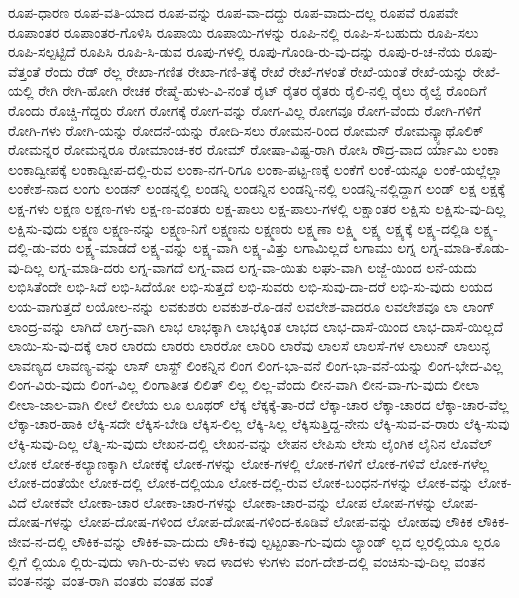 {ರೂಪ-ಧಾರಣ
ರೂಪ-ವತಿ-ಯಾದ
ರೂಪ-ವನ್ನು
ರೂಪ-ವಾ-ದದ್ದು
ರೂಪ-ವಾದು-ದಲ್ಲ
ರೂಪವೆ
ರೂಪವೇ
ರೂಪಾಂತರ
ರೂಪಾಂತರ-ಗೊಳಿಸಿ
ರೂಪಾಯಿ
ರೂಪಾಯಿ-ಗಳನ್ನು
ರೂಪಿ-ನಲ್ಲಿ
ರೂಪಿ-ಸ-ಬಹುದು
ರೂಪಿ-ಸಲು
ರೂಪಿ-ಸಲ್ಪಟ್ಟಿದೆ
ರೂಪಿಸಿ
ರೂಪಿ-ಸಿ-ಡುವ
ರೂಪು-ಗಳಲ್ಲಿ
ರೂಪು-ಗೊಂಡಿ-ರು-ವು-ದನ್ನು
ರೂಪು-ರ-ಚ-ನೆಯ
ರೂಪು-ವೆತ್ತಂತೆ
ರೆಂದು
ರೆಡ್
ರೆಲ್ಲ
ರೇಖಾ-ಗಣಿತ
ರೇಖಾ-ಗಣಿ-ತಕ್ಕೆ
ರೇಖೆ
ರೇಖೆ-ಗಳಂತೆ
ರೇಖೆ-ಯಂತೆ
ರೇಖೆ-ಯನ್ನು
ರೇಖೆ-ಯಲ್ಲಿ
ರೇಗಿ
ರೇಗಿ-ಹೋಗಿ
ರೇಚಕ
ರೇಷ್ಮೆ-ಹುಳು-ವಿ-ನಂತೆ
ರೈಟ್
ರೈತರ
ರೈತರು
ರೈಲಿ-ನಲ್ಲಿ
ರೈಲು
ರೈಲ್ವೆ
ರೊಂದಿಗೆ
ರೊಂದು
ರೊಚ್ಚಿ-ಗೆದ್ದರು
ರೋಗ
ರೋಗಕ್ಕೆ
ರೋಗ-ವನ್ನು
ರೋಗ-ವಿಲ್ಲ
ರೋಗವೂ
ರೋಗ-ವೆಂದು
ರೋಗಿ-ಗಳಿಗೆ
ರೋಗಿ-ಗಳು
ರೋಗಿ-ಯನ್ನು
ರೋದನೆ-ಯನ್ನು
ರೋದಿ-ಸಲು
ರೋಮನ-ರಿಂದ
ರೋಮನ್
ರೋಮನ್ಕ್ಯಾಥೊಲಿಕ್
ರೋಮನ್ನರ
ರೋಮನ್ನರೂ
ರೋಮಾಂಚ-ಕರ
ರೋಮ್
ರೋಷಾ-ವಿಷ್ಟ-ರಾಗಿ
ರೋಸಿ
ರೌದ್ರ-ವಾದ
ರ್ಯಾಮಿ
ಲಂಕಾ
ಲಂಕಾದ್ವೀಪಕ್ಕೆ
ಲಂಕಾದ್ವೀಪ-ದಲ್ಲಿ-ರುವ
ಲಂಕಾ-ನಗ-ರಿಗೂ
ಲಂಕಾ-ಪಟ್ಟ-ಣಕ್ಕೆ
ಲಂಕೆಗೆ
ಲಂಕೆ-ಯನ್ನೂ
ಲಂಕೆ-ಯಲ್ಲೆಲ್ಲಾ
ಲಂಕೇಶ-ನಾದ
ಲಂಗು
ಲಂಡನ್
ಲಂಡನ್ನಲ್ಲಿ
ಲಂಡನ್ನಿ
ಲಂಡನ್ನಿನ
ಲಂಡನ್ನಿ-ನಲ್ಲಿ
ಲಂಡನ್ನಿ-ನಲ್ಲಿದ್ದಾಗ
ಲಂಡ್
ಲಕ್ಷ
ಲಕ್ಷಕ್ಕೆ
ಲಕ್ಷ-ಗಳು
ಲಕ್ಷಣ
ಲಕ್ಷಣ-ಗಳು
ಲಕ್ಷ-ಣ-ವಂತರು
ಲಕ್ಷ-ಪಾಲು
ಲಕ್ಷ-ಪಾಲು-ಗಳಲ್ಲಿ
ಲಕ್ಷಾಂತರ
ಲಕ್ಷಿಸು
ಲಕ್ಷಿಸು-ವು-ದಿಲ್ಲ
ಲಕ್ಷಿಸು-ವುದು
ಲಕ್ಷ್ಮಣ
ಲಕ್ಷ್ಮಣ-ನನ್ನು
ಲಕ್ಷ್ಮಣ-ನಿಗೆ
ಲಕ್ಷ್ಮಣನು
ಲಕ್ಷ್ಮಣರು
ಲಕ್ಷ್ಮಣಾ
ಲಕ್ಷ್ಮಿ
ಲಕ್ಷ್ಯ
ಲಕ್ಷ್ಯಕ್ಕೆ
ಲಕ್ಷ್ಯ-ದಲ್ಲಿಡಿ
ಲಕ್ಷ್ಯ-ದಲ್ಲಿ-ಡು-ವರು
ಲಕ್ಷ್ಯ-ಮಾಡದೆ
ಲಕ್ಷ್ಯ-ವನ್ನು
ಲಕ್ಷ್ಯ-ವಾಗಿ
ಲಕ್ಷ್ಯ-ವಿತ್ತು
ಲಗಾಮಿಲ್ಲದೆ
ಲಗಾಮು
ಲಗ್ನ
ಲಗ್ನ-ಮಾಡಿ-ಕೊಡು-ವು-ದಿಲ್ಲ
ಲಗ್ನ-ಮಾಡಿ-ದರು
ಲಗ್ನ-ವಾಗದೆ
ಲಗ್ನ-ವಾದ
ಲಗ್ನ-ವಾ-ಯಿತು
ಲಘು-ವಾಗಿ
ಲಜ್ಜೆ-ಯಿಂದ
ಲನೆ-ಯದು
ಲಭಿಸಿತೆಂದೇ
ಲಭಿ-ಸಿದೆ
ಲಭಿ-ಸಿದೆಯೋ
ಲಭಿ-ಸುತ್ತದೆ
ಲಭಿ-ಸುವರು
ಲಭಿ-ಸುವು-ದಾ-ದರೆ
ಲಭಿ-ಸು-ವುದು
ಲಯದ
ಲಯ-ವಾಗುತ್ತದೆ
ಲಯೋಲ-ನನ್ನು
ಲವಕುಶರು
ಲವಕುಶ-ರೊ-ಡನೆ
ಲವಲೇಶ-ವಾದರೂ
ಲವಲೇಶವೂ
ಲಾ
ಲಾಂಗ್
ಲಾಂದ್ರ-ವನ್ನು
ಲಾಗಿದೆ
ಲಾಗ್ರ-ವಾಗಿ
ಲಾಭ
ಲಾಭಕ್ಕಾಗಿ
ಲಾಭಕ್ಕಿಂತ
ಲಾಭದ
ಲಾಭ-ದಾಸೆ-ಯಿಂದ
ಲಾಭ-ದಾಸೆ-ಯಿಲ್ಲದೆ
ಲಾಯಿ-ಸು-ವು-ದಕ್ಕೆ
ಲಾರ
ಲಾರದು
ಲಾರರು
ಲಾರರೋ
ಲಾರಿರಿ
ಲಾರೆವು
ಲಾಲಸೆ
ಲಾಲಸೆ-ಗಳ
ಲಾಲುನ್
ಲಾಲುನ್ಳ
ಲಾವಣ್ಯದ
ಲಾವಣ್ಯ-ವನ್ನು
ಲಾಸ್
ಲಾಸ್ಟ್
ಲಿಂಕನ್ನಿನ
ಲಿಂಗ
ಲಿಂಗ-ಭಾ-ವನೆ
ಲಿಂಗ-ಭಾ-ವನೆ-ಯನ್ನು
ಲಿಂಗ-ಭೇದ-ವಿಲ್ಲ
ಲಿಂಗ-ವಿರು-ವುದು
ಲಿಂಗ-ವಿಲ್ಲ
ಲಿಂಗಾತೀತ
ಲಿಲಿತ್
ಲಿಲ್ಲ
ಲಿಲ್ಲ-ವೆಂದು
ಲೀನ-ವಾಗಿ
ಲೀನ-ವಾ-ಗು-ವುದು
ಲೀಲಾ
ಲೀಲಾ-ಜಾಲ-ವಾಗಿ
ಲೀಲೆ
ಲೀಲೆಯ
ಲೂ
ಲೂಥರ್
ಲೆಕ್ಕ
ಲೆಕ್ಕಕ್ಕೆ-ತಾ-ರದೆ
ಲೆಕ್ಕಾ-ಚಾರ
ಲೆಕ್ಕಾ-ಚಾರದ
ಲೆಕ್ಕಾ-ಚಾರ-ವೆಲ್ಲ
ಲೆಕ್ಕಾ-ಚಾರ-ಹಾಕಿ
ಲೆಕ್ಕಿ-ಸದೇ
ಲೆಕ್ಕಿಸ-ಬೇಡಿ
ಲೆಕ್ಕಿಸ-ಲಿಲ್ಲ
ಲೆಕ್ಕಿ-ಸಿಲ್ಲ
ಲೆಕ್ಕಿಸುತ್ತಿದ್ದ-ನೇನು
ಲೆಕ್ಕಿ-ಸುವ-ವ-ರಾರು
ಲೆಕ್ಕಿ-ಸುವು
ಲೆಕ್ಕಿ-ಸುವು-ದಿಲ್ಲ
ಲೆತ್ನಿ-ಸು-ವುದು
ಲೇಖನ-ದಲ್ಲಿ
ಲೇಖನ-ವನ್ನು
ಲೇಪನ
ಲೇಪಿಸು
ಲೇಸು
ಲೈಂಗಿಕ
ಲೈನಿನ
ಲೊವೆಲ್
ಲೋಕ
ಲೋಕ-ಕಲ್ಯಾಣಕ್ಕಾಗಿ
ಲೋಕಕ್ಕೆ
ಲೋಕ-ಗಳನ್ನು
ಲೋಕ-ಗಳಲ್ಲಿ
ಲೋಕ-ಗಳಿಗೆ
ಲೋಕ-ಗಳಿವೆ
ಲೋಕ-ಗಳೆಲ್ಲ
ಲೋಕ-ದಂತೆಯೇ
ಲೋಕ-ದಲ್ಲಿ
ಲೋಕ-ದಲ್ಲಿಯೂ
ಲೋಕ-ದಲ್ಲಿ-ರುವ
ಲೋಕ-ಬಂಧನ-ಗಳನ್ನು
ಲೋಕ-ವನ್ನು
ಲೋಕ-ವಿದೆ
ಲೋಕವೇ
ಲೋಕಾ-ಚಾರ
ಲೋಕಾ-ಚಾರ-ಗಳನ್ನು
ಲೋಕಾ-ಚಾರ-ವನ್ನು
ಲೋಪ
ಲೋಪ-ಗಳನ್ನು
ಲೋಪ-ದೋಷ-ಗಳನ್ನು
ಲೋಪ-ದೋಷ-ಗಳಿಂದ
ಲೋಪ-ದೋಷ-ಗಳಿಂದ-ಕೂಡಿವೆ
ಲೋಪ-ವನ್ನು
ಲೋಹವು
ಲೌಕಿಕ
ಲೌಕಿಕ-ಜೀವ-ನ-ದಲ್ಲಿ
ಲೌಕಿಕ-ವನ್ನು
ಲೌಕಿಕ-ವಾ-ದುದು
ಲೌಕಿ-ಕವು
ಲ್ಪಟ್ಟಂತಾ-ಗು-ವುದು
ಲ್ಯಾಂಡ್
ಲ್ಲದ
ಲ್ಲರಲ್ಲಿಯೂ
ಲ್ಲರೂ
ಲ್ಲಿಗೆ
ಲ್ಲಿಯೂ
ಲ್ಲಿರು-ವುದು
ಳಾಗಿ-ರು-ವಳು
ಳಾದ
ಳಾದಳು
ಳುಗಳು
ವಂಗ-ದೇಶ-ದಲ್ಲಿ
ವಂಚಿಸು-ವು-ದಿಲ್ಲ
ವಂತನ
ವಂತ-ನನ್ನು
ವಂತ-ರಾಗಿ
ವಂತರು
ವಂತಹ
ವಂತೆ
}
